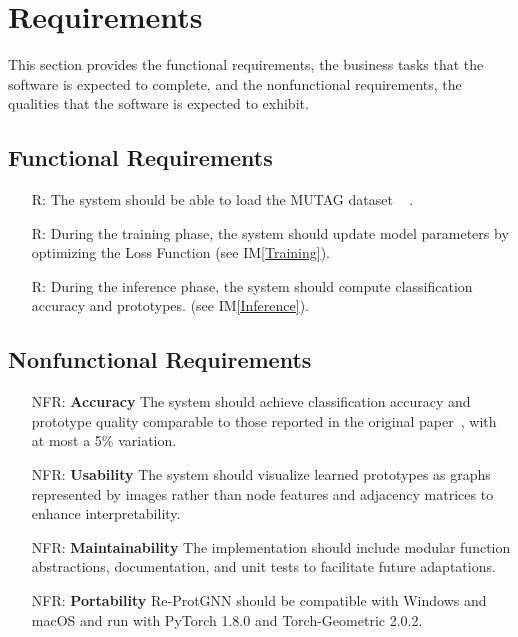 \documentclass[12pt]{article}
\newcommand{\iref}[1]{IM\ref{#1}}
\newcounter{reqnum} %
\newcounter{nfrnum} %
\begin{document}
\section{Requirements}

This section provides the functional requirements, the business tasks that the
software is expected to complete, and the nonfunctional requirements, the
qualities that the software is expected to exhibit.

\subsection{Functional Requirements}

\noindent \begin{itemize}

\item[R\refstepcounter{reqnum}\thereqnum \label{R_Inputs}:] The system should be able to load the MUTAG dataset ~\cite{debnath1991structure} .

\item[R\refstepcounter{reqnum}\thereqnum \label{R_Train}:] During the training phase, the system should update model parameters by optimizing the Loss Function (see \iref{Training}).

\item[R\refstepcounter{reqnum}\thereqnum \label{R_VerifyOutput}:] During the inference phase, the system should compute classification accuracy and prototypes. (see \iref{Inference}).


\end{itemize}


\subsection{Nonfunctional Requirements}

\noindent \begin{itemize}

\item[NFR\refstepcounter{nfrnum}\thenfrnum \label{NFR_Accuracy}:]
  \textbf{Accuracy} The system should achieve classification accuracy and prototype quality comparable to those reported in the original paper~\cite{zhang2022}, with at most a 5\% variation.

\item[NFR\refstepcounter{nfrnum}\thenfrnum \label{NFR_Usability}:] \textbf{Usability}
  The system should visualize learned prototypes as graphs represented by images rather than node features and adjacency matrices to enhance interpretability.

\item[NFR\refstepcounter{nfrnum}\thenfrnum \label{NFR_Maintainability}:]
  \textbf{Maintainability} The implementation should include modular function abstractions, documentation, and unit tests to facilitate future adaptations.

\item[NFR\refstepcounter{nfrnum}\thenfrnum \label{NFR_Portability}:]
  \textbf{Portability} Re-ProtGNN should be compatible with Windows and macOS and run with PyTorch 1.8.0 and Torch-Geometric 2.0.2.
  

\end{itemize}
\end{document}
